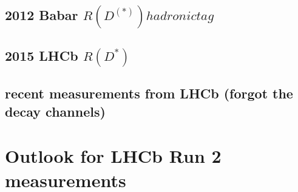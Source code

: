 \documentclass[10pt]{article}
\begin{document}
\subsection{2012 Babar $R(D^{(*)}) hadronic tag$}

\subsection{2015 LHCb $R(D^{*})$}

\subsection{recent measurements from LHCb (forgot the decay channels)}

\section{Outlook for LHCb Run 2 measurements}


\end{document}
